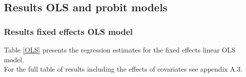 \documentclass[12pt]{article}
\begin{document}
\FloatBarrier


\subsection{Results OLS and probit models}

\FloatBarrier


\subsubsection{Results fixed effects OLS model}

Table \ref{OLS} presents the regression estimates for the fixed effects linear OLS model.\\
For the full table of results including the effects of covariates see appendix A.3. 
\end{document}
